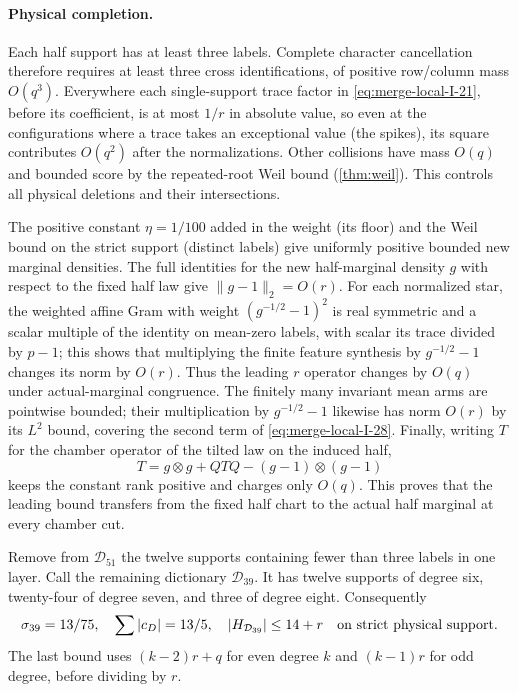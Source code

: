 \paragraph{Physical completion.}
Each half support has at least three labels. Complete character
cancellation therefore requires at least three cross identifications, of positive row/column mass $O(q^3)$.
Everywhere each single-support trace factor in \eqref{eq:merge-local-I-21}, before its coefficient, is at most $1/r$ in absolute value, so even at the configurations where
a trace takes an exceptional value (the spikes), its square
contributes $O(q^2)$ after the normalizations. Other collisions have mass $O(q)$ and bounded
score by the repeated-root Weil bound (\cref{thm:weil}). This controls all
physical deletions and their intersections.

The positive constant $\eta=1/100$ added in the weight (its
floor) and the Weil bound on the strict support (distinct
labels) give uniformly
positive bounded new marginal densities. The full identities for the new half-marginal density $g$
with respect to the fixed half law give $\|g-1\|_2=O(r)$. For each normalized star, the weighted
affine Gram with weight $(g^{-1/2}-1)^2$ is real symmetric
and a scalar multiple of the identity on mean-zero labels,
with scalar its trace divided by $p-1$; this shows that multiplying the finite feature synthesis by
$g^{-1/2}-1$ changes its norm by $O(r)$. Thus the leading
$r$ operator changes by $O(q)$ under actual-marginal
congruence. The finitely many invariant mean arms are pointwise
bounded; their multiplication by $g^{-1/2}-1$ likewise has norm
$O(r)$ by its $L^2$ bound, covering the second term of \eqref{eq:merge-local-I-28}.
Finally, writing $T$ for the chamber operator of the tilted law
on the induced half,
\begin{equation}\label{eq:merge-local-I-29}
 T=g\otimes g+QTQ-(g-1)\otimes(g-1)
\end{equation}
keeps the constant rank positive and charges only $O(q)$.
This proves that the leading bound transfers from the fixed half chart to the actual half marginal at every chamber cut.

Remove from $\mathcal D_{51}$ the twelve supports containing
fewer than three labels in one layer. Call the remaining
dictionary $\mathcal D_{39}$. It has twelve supports of degree
six, twenty-four of degree seven, and three of degree eight.
Consequently
\begin{equation}\label{eq:merge-local-I-30}
 \sigma_{39}=13/75,\quad \sum|c_D|=13/5,\quad
 |H_{\mathcal D_{39}}|\le14+r
 \quad\hbox{on strict physical support}.
\end{equation}
The last bound uses $(k-2)r+q$ for even degree $k$ and
$(k-1)r$ for odd degree, before dividing by $r$.

